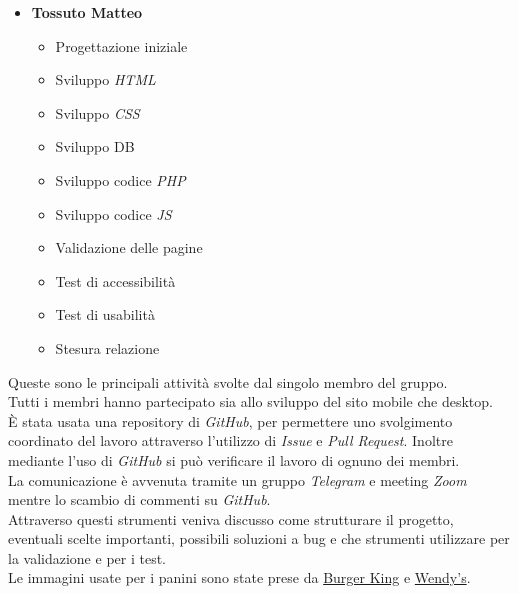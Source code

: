 \begin{itemize}
\begin{itemize}
	\end{itemize}
	\item \textbf{Tossuto Matteo}
	\begin{itemize}
		\item Progettazione iniziale
		\item Sviluppo \emph{HTML}
		\item Sviluppo \emph{CSS}
		\item Sviluppo DB
		\item Sviluppo codice \emph{PHP}
		\item Sviluppo codice \emph{JS}
		\item Validazione delle pagine
		\item Test di accessibilità
		\item Test di usabilità
		\item Stesura relazione
	\end{itemize}
\end{itemize}

Queste sono le principali attività svolte dal singolo membro del gruppo.\\
Tutti i membri hanno partecipato sia allo sviluppo del sito mobile che desktop.\\
È stata usata una repository di \emph{GitHub}, per permettere uno svolgimento coordinato del lavoro attraverso l'utilizzo di \emph{Issue} e \emph{Pull Request}. Inoltre mediante l'uso di \emph{GitHub} si può verificare il lavoro di ognuno dei membri.\\
La comunicazione è avvenuta tramite un gruppo \emph{Telegram} e meeting \emph{Zoom} mentre lo scambio di commenti su \emph{GitHub}.\\
Attraverso questi strumenti veniva discusso come strutturare il progetto, eventuali scelte importanti, possibili soluzioni a bug e che strumenti utilizzare per la validazione e per i test.\\
Le immagini usate per i panini sono state prese da \href{https://www.burgerking.it/prodotti/meat/}{Burger King} e \href{https://order.wendys.com/category/100/hamburgers}{Wendy's}.